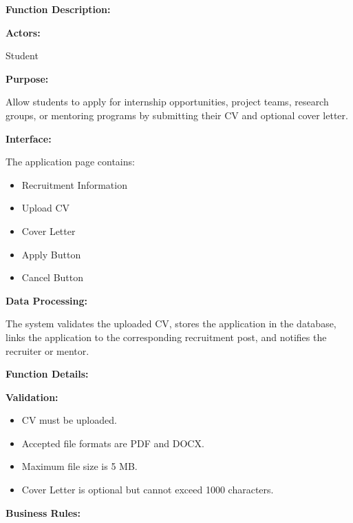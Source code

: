 \vspace{0.3cm}

\textbf{Function Description:}

\textbf{Actors:}

Student

\vspace{0.2cm}

\textbf{Purpose:}

Allow students to apply for internship opportunities, project teams, research groups, or mentoring programs by submitting their CV and optional cover letter.

\vspace{0.2cm}

\textbf{Interface:}

The application page contains:

\begin{itemize}
    \item Recruitment Information
    \item Upload CV
    \item Cover Letter
    \item Apply Button
    \item Cancel Button
\end{itemize}

\vspace{0.2cm}

\textbf{Data Processing:}

The system validates the uploaded CV, stores the application in the database, links the application to the corresponding recruitment post, and notifies the recruiter or mentor.

\vspace{0.3cm}

\textbf{Function Details:}

\textbf{Validation:}

\begin{itemize}
    \item CV must be uploaded.
    \item Accepted file formats are PDF and DOCX.
    \item Maximum file size is 5 MB.
    \item Cover Letter is optional but cannot exceed 1000 characters.
\end{itemize}

\vspace{0.2cm}

\textbf{Business Rules:}

